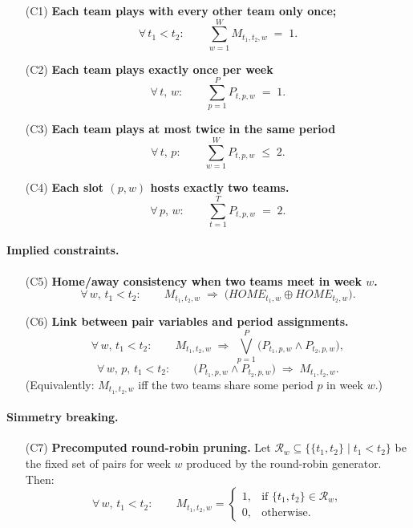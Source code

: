 \documentclass{article}
\begin{document}
\begin{itemize}
\item[(C1)] \textbf{Each team plays with every other team only once;}
\[
\forall\, t_1<t_2:\qquad
\sum_{w=1}^{W} M_{t_1,t_2,w} \;=\; 1.
\]

\item[(C2)] \textbf{Each team plays exactly once per week}
\[
\forall\, t,\,w:\qquad
\sum_{p=1}^{P} P_{t,p,w} \;=\; 1.
\]

\item[(C3)] \textbf{Each team plays at most twice in the same period}
\[
\forall\, t,\,p:\qquad
\sum_{w=1}^{W} P_{t,p,w} \;\le\; 2.
\]

\item[(C4)] \textbf{Each slot \((p,w)\) hosts exactly two teams.}
\[
\forall\, p,\,w:\qquad
\sum_{t=1}^{T} P_{t,p,w} \;=\; 2.
\]
\end{itemize}

\paragraph{Implied constraints.}

\begin{itemize}
\item[(C5)] \textbf{Home/away consistency when two teams meet in week \(w\).}
\[
\forall\, w,\, t_1<t_2:\qquad
M_{t_1,t_2,w} \;\Rightarrow\; \big(HOME_{t_1,w} \oplus HOME_{t_2,w}\big).
\]

\item[(C6)] \textbf{Link between pair variables and period assignments.}
\[
\forall\, w,\, t_1<t_2:\qquad
M_{t_1,t_2,w} \;\Rightarrow\; \bigvee_{p=1}^{P}\big(P_{t_1,p,w}\land P_{t_2,p,w}\big),
\]
\[
\forall\, w,\,p,\, t_1<t_2:\qquad
\big(P_{t_1,p,w}\land P_{t_2,p,w}\big) \;\Rightarrow\; M_{t_1,t_2,w}.
\]
(Equivalently: \(M_{t_1,t_2,w}\) iff the two teams share some period \(p\) in week \(w\).)
\end{itemize}

\paragraph{Simmetry breaking.}

\begin{itemize}
\item[(C7)] \textbf{Precomputed round-robin pruning.}
Let \(\mathcal{R}_w\subseteq\{\{t_1,t_2\}\mid t_1<t_2\}\) be the fixed set of pairs for week \(w\) produced by the round-robin generator. Then:
\[
\forall\, w,\, t_1<t_2:\qquad
M_{t_1,t_2,w} =
\begin{cases}
1, & \text{if }\{t_1,t_2\}\in \mathcal{R}_w,\\[4pt]
0, & \text{otherwise.}
\end{cases}
\]
\end{itemize}
\end{document}
